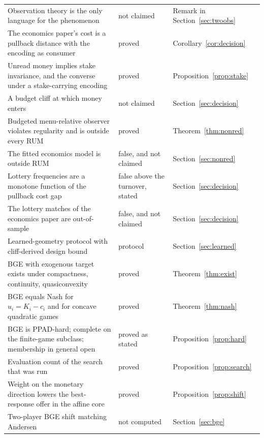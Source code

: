 \documentclass[11pt]{article}
\theoremstyle{definition}
\theoremstyle{remark}
\begin{document}
\begin{center}
\begin{tabular}{p{} p{} p{}}
Observation theory is the only language for the phenomenon & not claimed & Remark in Section~\ref{sec:twoobs} \\
The economics paper's cost is a pullback distance with the encoding as consumer & proved & Corollary~\ref{cor:decision} \\
Unread money implies stake invariance, and the converse under a stake-carrying encoding & proved & Proposition~\ref{prop:stake} \\
A budget cliff at which money enters & not claimed & Section~\ref{sec:decision} \\
Budgeted menu-relative observer violates regularity and is outside every RUM & proved & Theorem~\ref{thm:nonred} \\
The fitted economics model is outside RUM & false, and not claimed & Section~\ref{sec:nonred} \\
Lottery frequencies are a monotone function of the pullback cost gap & false above the turnover, stated & Section~\ref{sec:decision} \\
The lottery matches of the economics paper are out-of-sample & false, and not claimed & Section~\ref{sec:decision} \\
Learned-geometry protocol with cliff-derived design bound & protocol & Section~\ref{sec:learned} \\
BGE with exogenous target exists under compactness, continuity, quasiconvexity & proved & Theorem~\ref{thm:exist} \\
BGE equals Nash for $u_{i}=K_{i}-c_{i}$ and for concave quadratic games & proved & Theorem~\ref{thm:nash} \\
BGE is PPAD-hard; complete on the finite-game subclass; membership in general open & proved as stated & Proposition~\ref{prop:hard} \\
Evaluation count of the search that was run & proved & Proposition~\ref{prop:search} \\
Weight on the monetary direction lowers the best-response offer in the affine core & proved & Proposition~\ref{prop:shift} \\
Two-player BGE shift matching Andersen & not computed & Section~\ref{sec:bge} \\
\bottomrule
\end{tabular}
\end{center}
\end{document}

